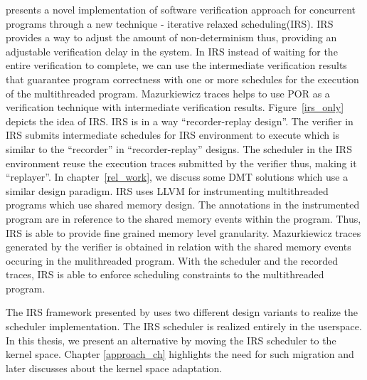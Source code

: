 \citet{metzler2017quick} presents a novel implementation of software verification approach for concurrent programs through a new technique - iterative relaxed scheduling(IRS). 
IRS provides a way to adjust the amount of non-determinism thus, providing an adjustable verification delay in the system. 
In IRS instead of waiting for the entire verification to complete, we can use the intermediate verification results that guarantee program correctness with one or more schedules for the execution of the multithreaded program. 
Mazurkiewicz traces helps to use POR as a verification technique with intermediate verification results. 
Figure~\ref{irs_only} depicts the idea of IRS. 
IRS is in a way ``recorder-replay design''. 
The verifier in IRS submits intermediate schedules for IRS environment to execute which is similar to the ``recorder'' in ``recorder-replay'' designs. 
The scheduler in the IRS environment reuse the execution traces submitted by the verifier thus, making it ``replayer''. 
In chapter~\ref{rel_work}, we discuss some DMT solutions which use a similar design paradigm.  
IRS uses LLVM for instrumenting multithreaded programs which use shared memory design. 
The annotations in the instrumented program are in reference to the shared memory events within the program. 
Thus, IRS is able to provide fine grained memory level granularity. 
Mazurkiewicz traces generated by the verifier is obtained in relation with the shared memory events occuring in the mulithreaded program. 
With the scheduler and the recorded traces, IRS is able to enforce scheduling constraints to the multithreaded program. 

The IRS framework presented by \citet{metzler2017quick} uses two different design variants to realize the scheduler implementation. 
The IRS scheduler is realized entirely in the userspace. 
In this thesis, we present an alternative by moving the IRS scheduler to the kernel space. 
Chapter \ref{approach_ch} highlights the need for such migration and later discusses about the kernel space adaptation. 


